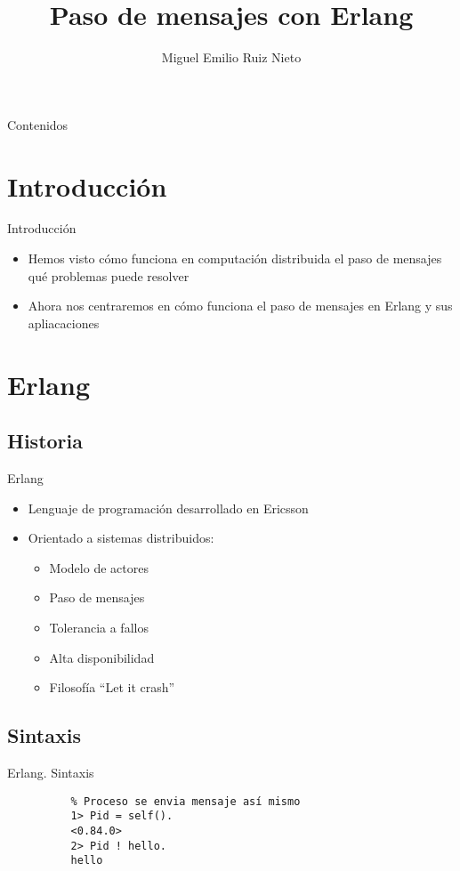 \documentclass{beamer}
\title[CAP]{Paso de mensajes con Erlang}
\author[M. Ruiz (UCM)]{Miguel Emilio Ruiz Nieto}
\date{\mydate}
\begin{document}
  \begin{frame}
    \titlepage
  \end{frame}

  \begin{frame}{Contenidos}
    \tableofcontents[hideallsubsections]
  \end{frame}

  \section{Introducción}
  \begin{frame}{Introducción}
    \begin{itemize}
      \item Hemos visto cómo funciona en computación distribuida el paso de
      mensajes qué problemas puede resolver
      \item Ahora nos centraremos en cómo funciona el paso de mensajes en Erlang
      y sus apliacaciones
    \end{itemize}
  \end{frame}

  \section{Erlang}
    \subsection{Historia}
      \begin{frame}{Erlang}
        \begin{itemize}
          \item Lenguaje de programación desarrollado en Ericsson
          \item Orientado a sistemas distribuidos:
          \begin{itemize}
            \item Modelo de actores
            \item Paso de mensajes
            \item Tolerancia a fallos
            \item Alta disponibilidad
            \item Filosofía ``Let it crash''
          \end{itemize}
        \end{itemize}
      \end{frame}

      \subsection{Sintaxis}
      \begin{frame}[fragile]{Erlang. Sintaxis}
        \begin{verbatim}
          % Proceso se envia mensaje así mismo
          1> Pid = self().
          <0.84.0>
          2> Pid ! hello.
          hello
        \end{verbatim}
      \end{frame}
\end{document}
